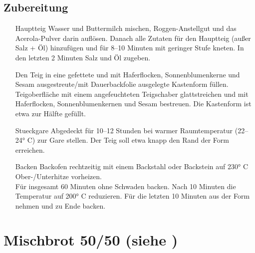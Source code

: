 \subsection*{Zubereitung}
\begin{enumerate}
    \item  [\Gls{Hauptteig}]  Wasser und Buttermilch mischen, Roggen-Anstellgut und das Acerola-Pulver darin auflösen. Danach alle Zutaten für den Hauptteig (außer Salz + Öl) hinzufügen und für 8–10 Minuten mit geringer Stufe kneten. In den letzten 2 Minuten Salz und Öl zugeben.
    \item [\GLS{Formen}] Den Teig in eine gefettete und mit Haferflocken, Sonnenblumenkerne und Sesam ausgestreute/mit Dauerbackfolie ausgelegte Kastenform füllen. Teigoberfläche mit einem angefeuchteten Teigschaber glattstreichen und mit Haferflocken, Sonnenblumenkernen und
    Sesam bestreuen. Die Kastenform ist etwa zur Hälfte gefüllt.
    \item [\Gls{Stueckgare}] Abgedeckt für 10–12 Stunden bei warmer Raumtemperatur (22–24° C) zur Gare stellen. Der Teig soll etwa knapp den Rand der Form erreichen.
    \item [\Gls{Backen}] Backofen rechtzeitig mit einem Backstahl oder Backstein auf 230° C Ober-/Unterhitze vorheizen. \\
    Für insgesamt 60 Minuten ohne Schwaden backen. Nach 10 Minuten die Temperatur auf
    200° C reduzieren. Für die letzten 10 Minuten aus der Form nehmen und zu Ende backen. 
\end{enumerate}



\section[Mischbrot 50/50]{Mischbrot 50/50 \textmd{(siehe \cite[130]{SonjaBauer2021})}}    

